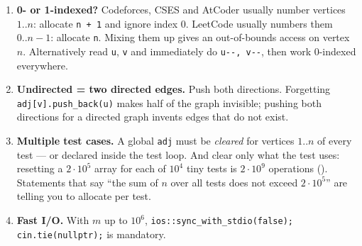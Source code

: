 \begin{enumerate}[leftmargin=*]
    \item \textbf{0- or 1-indexed?} Codeforces, CSES and AtCoder usually number vertices $1..n$: allocate \texttt{n + 1} and ignore index 0. LeetCode usually numbers them $0..n-1$: allocate \texttt{n}. Mixing them up gives an out-of-bounds access on vertex $n$. Alternatively read \texttt{u}, \texttt{v} and immediately do \texttt{u-{}-, v-{}-}, then work 0-indexed everywhere.
    \item \textbf{Undirected = two directed edges.} Push both directions. Forgetting \texttt{adj[v].push\_back(u)} makes half of the graph invisible; pushing both directions for a directed graph invents edges that do not exist.
    \item \textbf{Multiple test cases.} A global \texttt{adj} must be \emph{cleared} for vertices $1..n$ of every test --- or declared inside the test loop. And clear only what the test uses: resetting a $2\cdot10^5$ array for each of $10^4$ tiny tests is $2\cdot10^9$ operations (\tle). Statements that say ``the sum of $n$ over all tests does not exceed $2\cdot10^5$'' are telling you to allocate per test.
    \item \textbf{Fast I/O.} With $m$ up to $10^6$, \texttt{ios::sync\_with\_stdio(false); cin.tie(nullptr);} is mandatory.
\end{enumerate}

